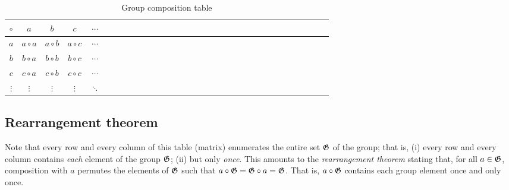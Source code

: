 \begin{table}
\begin{center}
\begin{tabular}{c|ccccccccccccccccccccccccccccccc}
$\circ$&$a$&$b$&$c$&$\cdots$\\
\hline
$a$&$a \circ a$&$a \circ b$&$a \circ c$&$\cdots$\\
$b$&$b \circ a$&$b \circ b$&$b \circ c$&$\cdots$  \\
$c$&$c \circ a$&$c \circ b$&$c \circ c$&$\cdots$    \\
$\vdots$&$\vdots$&$\vdots$&$\vdots$&$\ddots$
\end{tabular}
\caption{Group composition table\label{2017-m-ch-gt-t-gct}}
\end{center}
\end{table}

\subsection{Rearrangement theorem}

Note that every row and every column of this table (matrix) enumerates the entire set ${\frak G}$ of the group;
that is, (i)  every row and every column
contains {\em each} element of the group ${\frak G}$;
(ii) but only  {\em once}.
This amounts to the {\em rearrangement theorem}
stating that, for all $a \in  {\frak G}$, composition with $a$ permutes the elements of ${\frak G}$ such that
$a \circ {\frak G} =  {\frak G} \circ a = {\frak G}$.
That is, $a \circ {\frak G}$ contains each group element once and only once.

